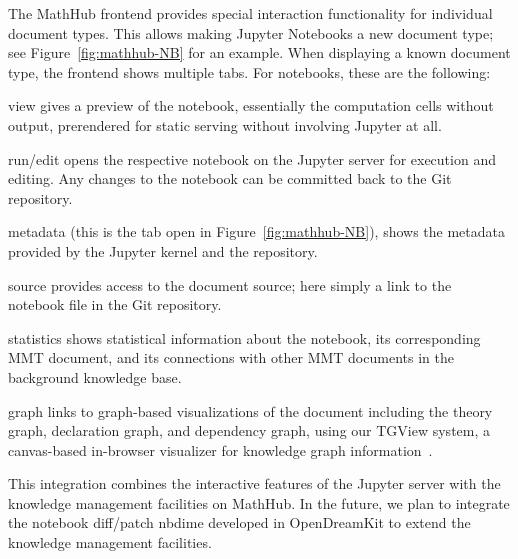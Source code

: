 The MathHub frontend provides special interaction functionality for individual document types.
This allows making Jupyter Notebooks a new document type; see Figure~\ref{fig:mathhub-NB} for an example.
When displaying a known document type, the frontend shows multiple tabs.
For notebooks, these are the following:
\begin{compactenum}
\item \textsf{view} gives a preview of the notebook, essentially the computation cells without output, prerendered for static serving without involving Jupyter at all.%
\item \textsf{run/edit} opens the respective notebook on the Jupyter server for execution and editing.
Any changes to the notebook can be committed back to the Git repository. 
\item \textsf{metadata} (this is the tab open in Figure~\ref{fig:mathhub-NB}), shows the metadata provided by the Jupyter kernel and the repository. 
\item \textsf{source} provides access to the document source; here simply a link to the notebook file in the Git repository.
\item \textsf{statistics} shows statistical information about the notebook, its corresponding MMT document, and its connections with other MMT documents in the background knowledge base.
\item \textsf{graph} links to graph-based visualizations of the document including the theory graph, declaration graph, and dependency graph, using our TGView system, a canvas-based in-browser visualizer for knowledge graph information~\cite{RupKohMue:fitgv17}.
\end{compactenum}
This integration combines the interactive features of the Jupyter server with the knowledge management facilities on MathHub. In the future, we plan to integrate the notebook diff/patch \textsf{nbdime} developed in OpenDreamKit to extend the knowledge management facilities. 

